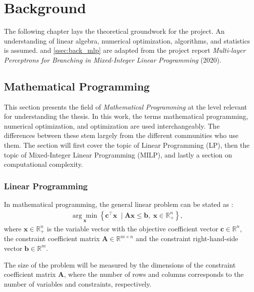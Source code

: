 \chapter{Background}\label{cha:background}

The following chapter lays the theoretical groundwork for the project. An understanding of linear algebra, numerical optimization, algorithms, and statistics is assumed.  and \ref{ssec:back_mlp} are adapted from the project report \textit{Multi-layer Perceptrons for Branching in Mixed-Integer Linear Programming} (2020). 


\section{Mathematical Programming}\label{sec:back_mathprog}

This section presents the field of \textit{Mathematical Programming} at the level relevant for understanding the thesis.
In this work, the terms mathematical programming, numerical optimization, and optimization are used interchangeably. The differences between these stem largely from the different communities who use them. The section will first cover the topic of Linear Programming (\gls{LP}), then the topic of Mixed-Integer Linear Programming (\gls{MILP}), and lastly a section on computational complexity.  


\subsection{Linear Programming}

In mathematical programming, the general linear problem can be stated as \cite{gasse2019exact}:
\begin{align} \label{eq:lp}
    \underset{\mathbf{x}}{\arg \min }\left\{\mathbf{c}^{\top} \mathbf{x} \; \mid \mathbf{A} \mathbf{x} \leq \mathbf{b},\; \mathbf{x} \in \mathbb{R}_+^{n}\right\},
\end{align}
where $ \mathbf{x} \in \mathbb{R}_+^n$ is the variable vector
with the objective coefficient vector $\mathbf{c} \in \mathbb{R}^n $, 
the constraint coefficient matrix $\mathbf{A} \in \mathbb{R}^{m \times n}$
and the constraint right-hand-side vector $\mathbf{b} \in \mathbb{R}^m $.

The size of the problem will be measured by the dimensions of the constraint coefficient matrix $ \mathbf{A} $, where the number of rows and columns corresponds to the number of variables and constraints, respectively.

